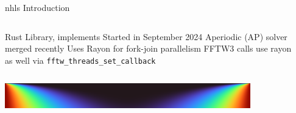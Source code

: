 \begin{frame}{nhls Introduction}
  \begin{columns}
  \begin{outline}
    \1 Rust Library, implements \cite{Ahmad2023}
    \1 Started in September 2024
    \1 Aperiodic (AP) solver merged recently
    \1 Uses Rayon for fork-join parallelism
    \2 FFTW3 calls use rayon as well via \lstinline{fftw_threads_set_callback}
  \end{outline}

  \begin{center}
  \centering
  \end{center}
  \end{columns}

  \begin{center}
  \includegraphics[width=0.8\textwidth]{heat_1d_ap.png}
  \end{center}
\end{frame}

